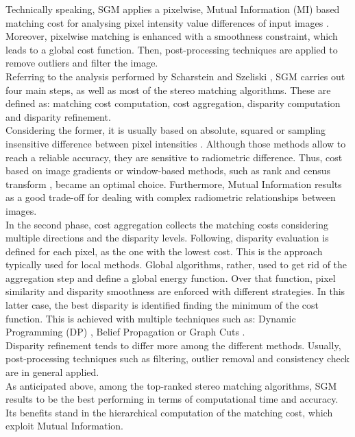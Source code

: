 Technically speaking, SGM applies a pixelwise, Mutual Information (MI) based matching cost for analysing pixel intensity value differences of input images \citep{Hirschmuller2008}.
Moreover, pixelwise matching is enhanced with a smoothness constraint, which leads to a global cost function. 
Then, post-processing techniques are applied to remove outliers and filter the image.\\
Referring to the analysis performed by Scharstein and Szeliski \citep{Scharstein2001}, SGM carries out four main steps, as well as most of the stereo matching algorithms. 
These are defined as: matching cost computation, cost aggregation, disparity computation and disparity refinement. \\
Considering the former, it is usually based on absolute, squared or sampling insensitive difference between pixel intensities \citep{Hirschmuller2008}. Although those methods allow to reach a reliable accuracy, they are sensitive to radiometric difference. 
Thus, cost based on image gradients or window-based methods, such as rank and census transform \citep{Ko2017Ko2017}, became an optimal choice. 
Furthermore, Mutual Information results as a good trade-off for dealing with complex radiometric relationships between images.\\
In the second phase, cost aggregation collects the matching costs considering multiple directions and the disparity levels. 
Following, disparity evaluation is defined for each pixel, as the one with the lowest cost. This is the approach typically used for local methods. 
Global algorithms, rather, used to get rid of the aggregation step and define a global energy function. 
Over that function, pixel similarity and disparity smoothness are enforced with different strategies. In this latter case, the best disparity is identified finding the minimum of the cost function. This is achieved with multiple techniques such as: Dynamic Programming (DP) \citep{Birchfield1999}, Belief Propagation \citep{Klaus2006} or Graph Cuts \citep{Kolmogorov2001}.\\
Disparity refinement tends to differ more among the different methods. Usually, post-processing techniques such as filtering, outlier removal and consistency check are in general applied.\\
As anticipated above, among the top-ranked stereo matching algorithms, SGM results to be the best performing in terms of computational time and accuracy. 
Its benefits stand in the hierarchical computation of the matching cost, which exploit Mutual Information. 

